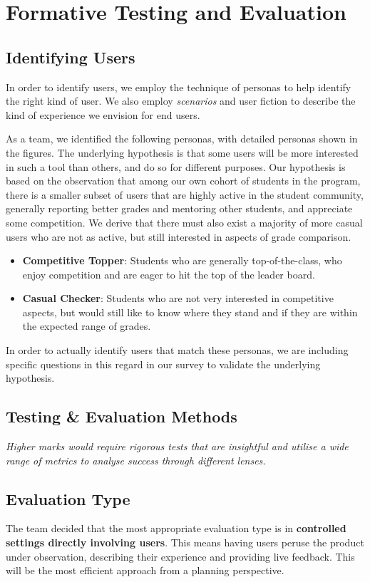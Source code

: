 \section{Formative Testing and Evaluation}
\subsection{Identifying Users}
In order to identify users, we employ the technique of personas to help identify the right kind of user. We also employ \textit{scenarios} and user fiction to describe the kind of experience we envision for end users.

As a team, we identified the following personas, with detailed personas shown in the figures. The underlying hypothesis is that some users will be more interested in such a tool than others, and do so for different purposes. Our hypothesis is based on the observation that among our own cohort of students in the program, there is a smaller subset of users that are highly active in the student community, generally reporting better grades and mentoring other students, and appreciate some competition. We derive that there must also exist a majority of more casual users who are not as active, but still interested in aspects of grade comparison.

\begin{itemize}
    \item \textbf{Competitive Topper}: Students who are generally top-of-the-class, who enjoy competition and are eager to hit the top of the leader board.
    \item \textbf{Casual Checker}: Students who are not very interested in competitive aspects, but would still like to know where they stand and if they are within the expected range of grades.
\end{itemize}

In order to actually identify users that match these personas, we are including specific questions in this regard in our survey to validate the underlying hypothesis.

\subsection{Testing \& Evaluation Methods}
\textit{Higher marks would require rigorous tests that are insightful and utilise a wide range of metrics to analyse success through different lenses.}


\subsection{Evaluation Type}
The team decided that the most appropriate evaluation type is in \textbf{controlled settings directly involving users}. This means having users peruse the product under observation, describing their experience and providing live feedback. This will be the most efficient approach from a planning perspective.

